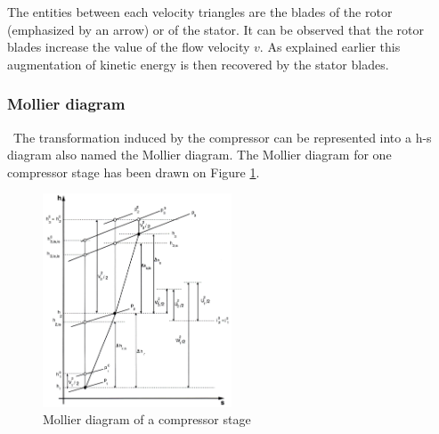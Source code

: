 The entities between each velocity triangles are the blades of the rotor (emphasized by an arrow) or of the stator. It can be observed that the rotor blades increase the value of the flow velocity \(v\). As explained earlier this augmentation of kinetic energy is then recovered by the stator blades.

\subsubsection{Mollier diagram}
\quad\ The transformation induced by the compressor can be represented into a h-s diagram also named the Mollier diagram. The Mollier diagram for one compressor stage has been drawn on Figure \ref{fig:C4_Molliercomp}.

\begin{figure}[h]
    \centering
    \includegraphics[width=0.5\textwidth]{Comp_mollier.png}
    \caption{Mollier diagram of a compressor stage \cite{Hillewaert2019}}
    \label{fig:C4_Molliercomp}
\end{figure}


